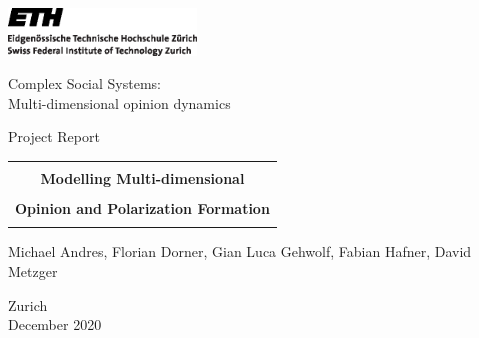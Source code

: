 
\thispagestyle{empty}

\begin{center}
\includegraphics[width=5cm]{ETHlogo.eps}

\bigskip


\bigskip


\bigskip


\LARGE{ Complex Social Systems:\\ }
\LARGE{Multi-dimensional opinion dynamics \\}

\bigskip

\bigskip

\small{Project Report}\\

\bigskip

\bigskip

\bigskip

\bigskip


\begin{tabular}{|c|}
\hline
\\
\textbf{\LARGE{Modelling Multi-dimensional }}\\
\\
\textbf{\LARGE{Opinion and Polarization Formation}} \\
\\
\hline
\end{tabular}
\bigskip

\bigskip

\bigskip

\LARGE{Michael Andres, Florian Dorner, Gian Luca Gehwolf, Fabian Hafner, David Metzger}



\bigskip

\bigskip

\bigskip

\bigskip

\bigskip

\bigskip

\bigskip

\bigskip

Zurich\\
December 2020\\

\end{center}


